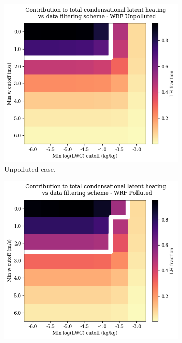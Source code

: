 \documentclass{article}
\begin{document}
\begin{figure}[ht]
	\centering
	\begin{subfigure}{0.7\textwidth}
		\includegraphics[width=\textwidth]{revmywrf/v1_FINAL_from_data_lh_frac_heatmap_Unpolluted_figure.png}
		\caption{Unpolluted case.}
		\label{lhheatmapunpoll}
	\end{subfigure}
	\begin{subfigure}{0.7\textwidth}
		\includegraphics[width=\textwidth]{revmywrf/v1_FINAL_from_data_lh_frac_heatmap_Polluted_figure.png}

\end{subfigure}
\end{figure}
\end{document}
